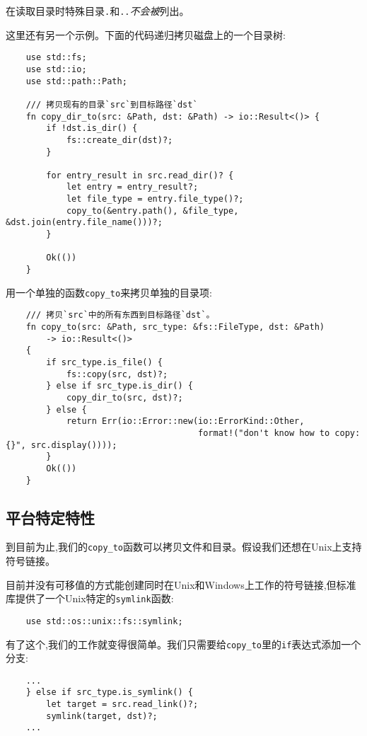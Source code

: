 
在读取目录时特殊目录\texttt{.}和\texttt{..}\emph{不会被}列出。

这里还有另一个示例。下面的代码递归拷贝磁盘上的一个目录树:
\begin{verbatim}
    use std::fs;
    use std::io;
    use std::path::Path;

    /// 拷贝现有的目录`src`到目标路径`dst`
    fn copy_dir_to(src: &Path, dst: &Path) -> io::Result<()> {
        if !dst.is_dir() { 
            fs::create_dir(dst)?;
        }

        for entry_result in src.read_dir()? {
            let entry = entry_result?;
            let file_type = entry.file_type()?;
            copy_to(&entry.path(), &file_type, &dst.join(entry.file_name()))?;
        }

        Ok(())
    }
\end{verbatim}

用一个单独的函数\texttt{copy\_to}来拷贝单独的目录项:
\begin{verbatim}
    /// 拷贝`src`中的所有东西到目标路径`dst`。
    fn copy_to(src: &Path, src_type: &fs::FileType, dst: &Path)
        -> io::Result<()>
    {
        if src_type.is_file() {
            fs::copy(src, dst)?;
        } else if src_type.is_dir() {
            copy_dir_to(src, dst)?;
        } else {
            return Err(io::Error::new(io::ErrorKind::Other,
                                      format!("don't know how to copy: {}", src.display())));
        }                                                            
        Ok(())
    }
\end{verbatim}

\subsection{平台特定特性}\label{PlatSpec}
到目前为止,我们的\texttt{copy\_to}函数可以拷贝文件和目录。假设我们还想在Unix上支持符号链接。

目前并没有可移值的方式能创建同时在Unix和Windows上工作的符号链接,但标准库提供了一个Unix特定的\texttt{symlink}函数:
\begin{verbatim}
    use std::os::unix::fs::symlink;
\end{verbatim}

有了这个,我们的工作就变得很简单。我们只需要给\texttt{copy\_to}里的\texttt{if}表达式添加一个分支:
\begin{verbatim}
    ...
    } else if src_type.is_symlink() {
        let target = src.read_link()?;
        symlink(target, dst)?;
    ...
\end{verbatim}


